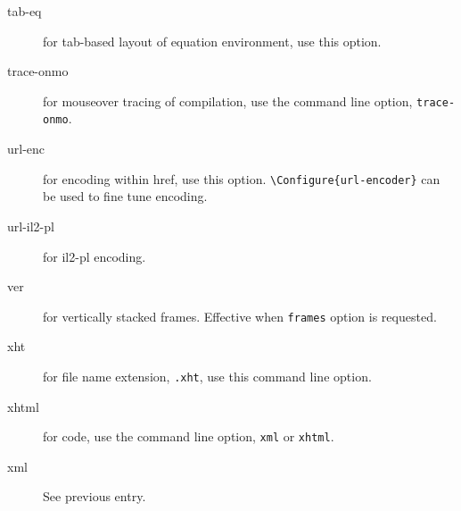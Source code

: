 \documentclass[a4paper]{article}
\begin{document}
\begin{description}
\item[tab-eq] for tab-based layout of equation environment, use this
  option.


\item[trace-onmo] for mouseover tracing of compilation, use the
  command line option, \verb=trace-onmo=.



\item[url-enc] for \space encoding within href, use this
  option.  \verb=\Configure{url-encoder}= can be used to fine tune
  encoding.

\item[url-il2-pl] for il2-pl  encoding.

\item[ver] for vertically stacked frames. Effective when \verb=frames=
  option is requested.


\item[xht] for file name extension, \verb=.xht=, use this command line
  option.

\item[xhtml] for \xml code, use the command line option, \verb=xml= or
  \verb=xhtml=.

\item[xml] See previous entry.


\end{description}

\ifx{} 
\end{document}
